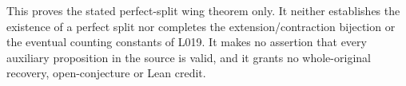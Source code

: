 \documentclass[11pt,a4paper]{article}
\begin{document}
This proves the stated perfect-split wing theorem only. It neither
establishes the existence of a perfect split nor completes the
extension/contraction bijection or the eventual counting constants
of L019. It makes no assertion that every auxiliary proposition
in the source is valid, and it grants no whole-original recovery,
open-conjecture or Lean credit.
\end{document}
